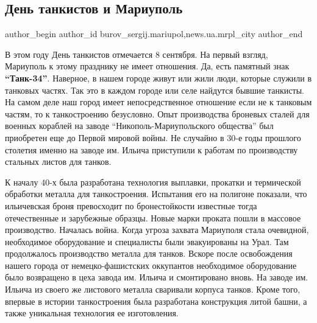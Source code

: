  
 
 
 
 
 
\subsection{День танкистов и Мариуполь}
\label{sec:07_09_2019.stz.news.ua.mrpl_city.1.den_tankistov_i_mariupol}
 
\ifcmt
 author_begin
   author_id burov_sergij.mariupol,news.ua.mrpl_city
 author_end
\fi


В этом году День танкистов отмечается 8 сентября. На первый взгляд, Мариуполь к
этому празднику не имеет отношения. Да, есть памятный знак
\textbf{\enquote{Танк-34}}.  Наверное, в нашем городе живут или жили люди,
которые служили в танковых частях. Так это в каждом городе или селе найдутся
бывшие танкисты. На самом деле наш город имеет непосредственное отношение если
не к танковым частям, то к танкостроению безусловно. Опыт производства броневых
сталей для военных кораблей на заводе \enquote{Никополь-Мариупольского
общества} был приобретен еще до Первой мировой войны. Не случайно в 30-е годы
прошлого столетия именно на заводе им. Ильича приступили к работам по
производству стальных листов для танков.

К началу 40-х была разработана технология выплавки, прокатки и термической
обработки металла для танкостроения. Испытания его на полигоне показали, что
ильичевская броня превосходит по бронестойкости известные тогда отечественные и
зарубежные образцы. Новые марки проката пошли в массовое производство. Началась
война. Когда угроза захвата Мариуполя стала очевидной, необходимое оборудование
и специалисты были эвакуированы на Урал. Там продолжалось производство металла
для танков. Вскоре после освобождения нашего города от немецко-фашистских
оккупантов необходимое оборудование было возвращено в цеха завода им. Ильича и
смонтировано вновь. На заводе им. Ильича из своего же листового металла
сваривали корпуса танков. Кроме того, впервые в истории танкостроения была
разработана конструкция литой башни, а также уникальная технология ее
изготовления.


